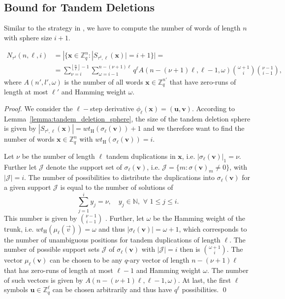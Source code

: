 \documentclass[a4paper]{llncs}
\newcommand{\ve}[1]{\boldsymbol{#1}}
\begin{document}
	\subsection{Bound for Tandem Deletions}
	Similar to the strategy in \cite{Fazeli15}, we have to compute the number of words of length $n$ with sphere size $i+1$.
	\begin{lemma}
		\begin{align*}
		N_{\tau^\delta}(n,\ell,i) &= |\{\ve{x} \in \mathbb{Z}_q^n : |S_{\tau^\delta, \ell}(\ve{x})| = i+1 \}| = \\
		&= \sum_{\nu=i}^{\left\lfloor\frac{n}{\ell}\right\rfloor-1}  \sum_{\omega=i-1}^{n-(\nu+1) \ell} q^\ell A(n - (\nu+1) \ell,\ell-1,\omega) \binom{\omega+1}{i} \binom{\nu-1}{i-1},
		\end{align*}
		where $A(n',l',\omega)$ is the number of all words $\ve{x} \in \mathbb{Z}_q^{n'}$ that have zero-runs of length at most $\ell'$ and Hamming weight $\omega$. 
	\end{lemma}
	\begin{proof}
		We consider the $\ell-$step derivative $\phi_\ell(\ve{x}) = (\ve{u}, \ve{v})$. According to Lemma~\ref{lemma:tandem_deletion_sphere}, the size of the tandem deletion sphere is given by $|S_{\tau^\delta, \ell}(\ve{x})| = wt_\mathrm{H}(\sigma_\ell(\ve{v})) + 1$ and we therefore want to find the number of words $\ve{x} \in \mathbb{Z}_q^n$ with $wt_\mathrm{H}(\sigma_\ell(\ve{v})) = i$.
		
		Let $\nu$ be the number of length $\ell$ tandem duplications in $\ve{x}$, i.e. $|\sigma_\ell(\ve{v})|_1 = \nu$. Further let $\mathcal{J}$ denote the support set of $\sigma_\ell(\ve{v})$, i.e. $\mathcal{J} = \{m : \sigma(\ve{v})_m \neq 0\}$, with $|\mathcal{J}| = i$. The number of possibilities to distribute the duplications into $\sigma_\ell(\ve{v})$ for a given support $\mathcal{J}$ is equal to the number of solutions of
		\begin{equation}
		\sum_{j=1}^{i}y_j = \nu, \quad y_j \in \mathbb{N}, \,\,\forall \,\, 1\leq j \leq i.
		\end{equation}
		This number is given by $\binom{\nu-1}{i-1}$ \cite[Lemma 2.2]{Kulkarni13}. Further, let $\omega$ be the Hamming weight of the trunk, i.e. $wt_{\mathrm{H}}(\mu_\ell(\vec{v})) = \omega$ and thus $|\sigma_\ell(\ve{v})| = \omega+1$, which corresponds to the number of unambiguous positions for tandem duplications of length $\ell$. The number of possible support sets $\mathcal{J}$ of $\sigma_\ell(\ve{v})$ with $|\mathcal{J}| = i$ then is $\binom{\omega+1}{i}$. The vector $\mu_\ell(\ve{v})$ can be chosen to be any $q$-ary vector of length $n-(\nu+1)\ell$ that has zero-runs of length at most $\ell-1$ and Hamming weight $\omega$. The number of such vectors is given by $A(n - (\nu+1) \ell,\ell-1,\omega)$. At last, the first $\ell$ symbols $\ve{u}\in \mathbb{Z}_q^\ell$ can be chosen arbitrarily and thus have $q^\ell$ possibilities. \qed
	\end{proof}
\end{document}
